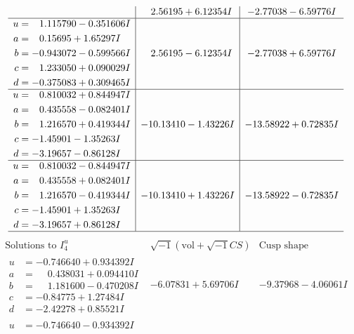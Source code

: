 \documentclass[1p]{elsarticle_modified}
\theoremstyle{definition}
\newcommand{\I}{\sqrt{-1}}
\begin{document}
$$\begin{array}{c|c|c}
 & \phantom{-}2.56195 + 6.12354 I & -2.77038 - 6.59776 I \\ \hline\begin{aligned}
u &= \phantom{-}1.115790 - 0.351606 I \\
a &= \phantom{-}0.15695 + 1.65297 I \\
b &= -0.943072 - 0.599566 I \\
c &= \phantom{-}1.233050 + 0.090029 I \\
d &= -0.375083 + 0.309465 I\end{aligned}
 & \phantom{-}2.56195 - 6.12354 I & -2.77038 + 6.59776 I \\ \hline\begin{aligned}
u &= \phantom{-}0.810032 + 0.844947 I \\
a &= \phantom{-}0.435558 - 0.082401 I \\
b &= \phantom{-}1.216570 + 0.419344 I \\
c &= -1.45901 - 1.35263 I \\
d &= -3.19657 - 0.86128 I\end{aligned}
 & -10.13410 - 1.43226 I & -13.58922 + 0.72835 I \\ \hline\begin{aligned}
u &= \phantom{-}0.810032 - 0.844947 I \\
a &= \phantom{-}0.435558 + 0.082401 I \\
b &= \phantom{-}1.216570 - 0.419344 I \\
c &= -1.45901 + 1.35263 I \\
d &= -3.19657 + 0.86128 I\end{aligned}
 & -10.13410 + 1.43226 I & -13.58922 - 0.72835 I\\
 \hline 
 \end{array}$$\newpage$$\begin{array}{c|c|c}  
\text{Solutions to }I^u_{4}& \I (\text{vol} + \sqrt{-1}CS) & \text{Cusp shape}\\
 \hline 
\begin{aligned}
u &= -0.746640 + 0.934392 I \\
a &= \phantom{-}0.438031 + 0.094410 I \\
b &= \phantom{-}1.181600 - 0.470208 I \\
c &= -0.84775 + 1.27484 I \\
d &= -2.42278 + 0.85521 I\end{aligned}
 & -6.07831 + 5.69706 I & -9.37968 - 4.06061 I \\ \hline\begin{aligned}
u &= -0.746640 - 0.934392 I \\

\end{aligned}
\end{array}$$
\end{document}
